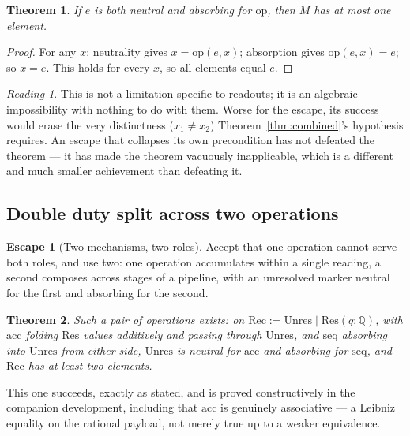 \documentclass[10pt,twocolumn]{article}
\theoremstyle{plain}
\newtheorem{theorem}{Theorem}
\theoremstyle{definition}
\newtheorem{escape}{Escape}
\theoremstyle{remark}
\newtheorem*{reading}{Reading}
\begin{document}
\begin{theorem}\label{thm:escape1}
If $e$ is both neutral and absorbing for $\mathrm{op}$, then $M$ has at most one element.
\end{theorem}

\begin{proof}
For any $x$: neutrality gives $x = \mathrm{op}(e,x)$; absorption gives $\mathrm{op}(e,x) = e$; so $x = e$. This holds for every $x$, so all elements equal $e$.
\end{proof}

\begin{reading}
This is not a limitation specific to readouts; it is an algebraic impossibility with nothing to do with them. Worse for the escape, its success would erase the very distinctness ($x_1 \neq x_2$) Theorem~\ref{thm:combined}'s hypothesis requires. An escape that collapses its own precondition has not defeated the theorem --- it has made the theorem vacuously inapplicable, which is a different and much smaller achievement than defeating it.
\end{reading}

\subsection{Double duty split across two operations}

\begin{escape}[Two mechanisms, two roles]
Accept that one operation cannot serve both roles, and use two: one operation accumulates within a single reading, a second composes across stages of a pipeline, with an unresolved marker neutral for the first and absorbing for the second.
\end{escape}

\begin{theorem}\label{thm:escape2}
Such a pair of operations exists: on $\mathrm{Rec} := \mathrm{Unres} \mid \mathrm{Res}(q{:}\mathbb{Q})$, with $\mathrm{acc}$ folding $\mathrm{Res}$ values additively and passing through $\mathrm{Unres}$, and $\mathrm{seq}$ absorbing into $\mathrm{Unres}$ from either side, $\mathrm{Unres}$ is neutral for $\mathrm{acc}$ and absorbing for $\mathrm{seq}$, and $\mathrm{Rec}$ has at least two elements.
\end{theorem}

This one succeeds, exactly as stated, and is proved constructively in the companion development, including that $\mathrm{acc}$ is genuinely associative --- a Leibniz equality on the rational payload, not merely true up to a weaker equivalence.
\end{document}
